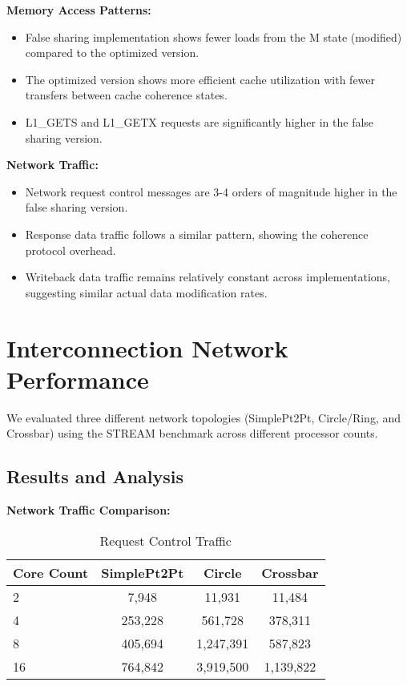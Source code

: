 \documentclass[9pt]{IEEEtran}
\begin{document}
\textbf{Memory Access Patterns:}
\begin{itemize}
  \item False sharing implementation shows fewer loads from the M state (modified) compared to the optimized version.
  \item The optimized version shows more efficient cache utilization with fewer transfers between cache coherence states.
  \item L1\_GETS and L1\_GETX requests are significantly higher in the false sharing version.
\end{itemize}

\textbf{Network Traffic:}
\begin{itemize}
  \item Network request control messages are 3-4 orders of magnitude higher in the false sharing version.
  \item Response data traffic follows a similar pattern, showing the coherence protocol overhead.
  \item Writeback data traffic remains relatively constant across implementations, suggesting similar actual data modification rates.
\end{itemize}

\section{Interconnection Network Performance}
We evaluated three different network topologies (SimplePt2Pt, Circle/Ring, and Crossbar) using the STREAM benchmark across different processor counts.

\subsection{Results and Analysis}

\textbf{Network Traffic Comparison:}

\begin{table}[htbp]
\centering
\caption{Request Control Traffic}
\begin{adjustbox}{max width=\columnwidth}
\begin{tabular}{@{}lccc@{}}
\toprule
Core Count & SimplePt2Pt & Circle & Crossbar \\
\midrule
2  & 7,948   & 11,931    & 11,484 \\
4  & 253,228 & 561,728   & 378,311 \\
8  & 405,694 & 1,247,391 & 587,823 \\
16 & 764,842 & 3,919,500 & 1,139,822 \\
\bottomrule
\end{tabular}
\end{adjustbox}
\end{table}
\end{document}

